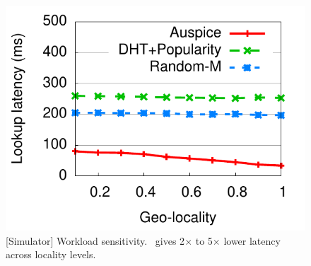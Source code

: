 \begin{figure}[ht]
\begin{minipage}[b]{0.35\linewidth}
\label{fig:manageddnsupdate}
\end{minipage}
\hspace{0.3cm}
\begin{minipage}[b]{0.3\linewidth}
\centering
\includegraphics[scale=0.53]{auspice/graph/medianlatencyVSlocality.pdf}
\caption{[Simulator] Workload sensitivity. \auspice\ gives 2$\times$ to 5$\times$  lower latency across locality levels.}
\label{fig:varylocality}
\end{minipage}
\end{figure}


